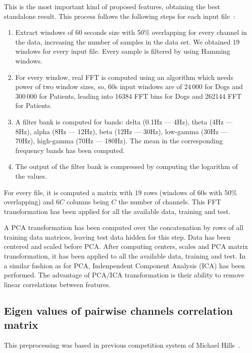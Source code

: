 \documentclass[a4paper,english,twoside]{article}
\begin{document}
This is the most important kind of proposed features, obtaining the best
standalone result. This process follows the following steps for each input
file~\cite{2014:howbert:plosone}:

\begin{enumerate}
\item
  Extract windows of 60 seconds size with 50\% overlapping for every
  channel in the data, increasing the number of samples in the data set.
  We obtained 19 windows for every input file. Every sample is filtered
  by using Hamming windows.
\item
  For every window, real FFT is computed using an algorithm which needs
  power of two window sizes, so, 60s input windows are of 24\,000 for Dogs
  and 300\,000 for Patients, leading into 16384 FFT bins for Dogs and
  262144 FFT for Patients.
\item A filter bank is computed for bands: delta (0.1Hz --- 4Hz), theta (4Hz ---
  8Hz), alpha (8Hz --- 12Hz), beta (12Hz --- 30Hz), low-gamma (30Hz --- 70Hz),
  high-gamma (70Hz --- 180Hz). The mean in the corresponding frequency bands has
  been computed.
\item
  The output of the filter bank is compressed by computing the logarithm
  of the values.
\end{enumerate}

For every file, it is computed a matrix with 19 rows (windows of 60s with 50\%
overlapping) and $6C$ columns being $C$ the number of channels. This FFT
transformation has been applied for all the available data, training and test.

A PCA transformation has been computed over the concatenation by rows of all
training data matrices, leaving test data hidden for this step. Data has been
centered and scaled before PCA. After computing centers, scales and PCA matrix
transformation, it has been applied to all the available data, training and
test. In a similar fashion as for PCA, Indenpendent Component Analysis (ICA) has
been performed. The advantage of PCA/ICA transformation is their ability to
remove linear correlations between features.

\subsection{Eigen values of pairwise channels correlation
  matrix}\label{eigen-values-of-pairwise-channels-correlation-matrix}

This preprocessing was based in previous competition system of Michael
Hills~\cite{michaelhills}.
\end{document}

